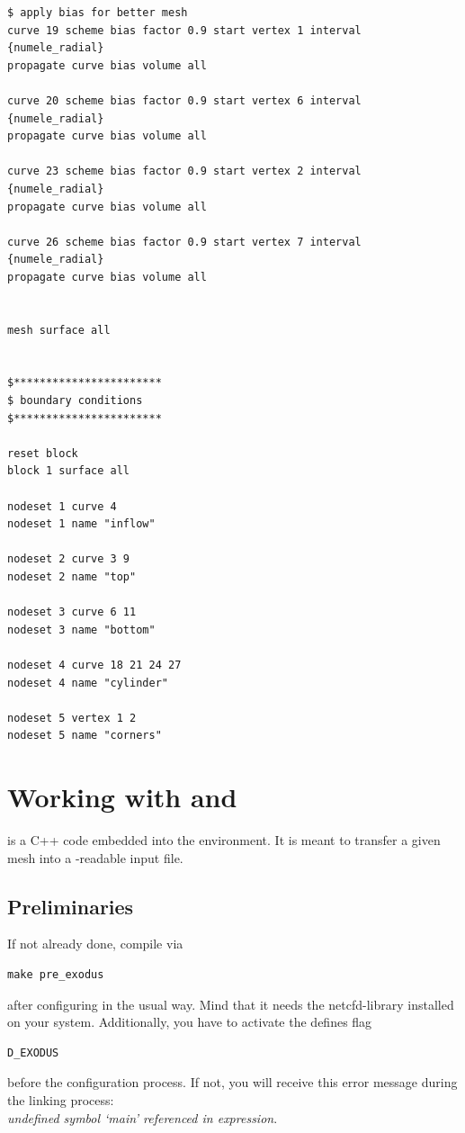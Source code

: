 \begin{small}
\begin{verbatim}
$ apply bias for better mesh
curve 19 scheme bias factor 0.9 start vertex 1 interval {numele_radial}
propagate curve bias volume all

curve 20 scheme bias factor 0.9 start vertex 6 interval {numele_radial}
propagate curve bias volume all

curve 23 scheme bias factor 0.9 start vertex 2 interval {numele_radial}
propagate curve bias volume all

curve 26 scheme bias factor 0.9 start vertex 7 interval {numele_radial}
propagate curve bias volume all


mesh surface all


$***********************
$ boundary conditions 
$***********************

reset block
block 1 surface all

nodeset 1 curve 4
nodeset 1 name "inflow"

nodeset 2 curve 3 9
nodeset 2 name "top"

nodeset 3 curve 6 11
nodeset 3 name "bottom"

nodeset 4 curve 18 21 24 27
nodeset 4 name "cylinder"

nodeset 5 vertex 1 2
nodeset 5 name "corners"
\end{verbatim} \end{small}


\section{Working with \prexo and \baci{}}

\prexo is a C++ code embedded into the \baci{} environment. It is meant to
transfer a given mesh into a \baci{}-readable input file.

\subsection{Preliminaries}

If not already done, compile \prexo via \begin{verbatim}make pre_exodus\end{verbatim} after 
configuring \baci{} in the usual way. Mind that it needs the netcfd-library 
installed on your system. Additionally, you have to activate the defines flag
\begin{verbatim}D_EXODUS\end{verbatim}
before the configuration process. If not, you will receive this error
message during the linking process:\\
\emph{undefined symbol `main' referenced in expression}. 


